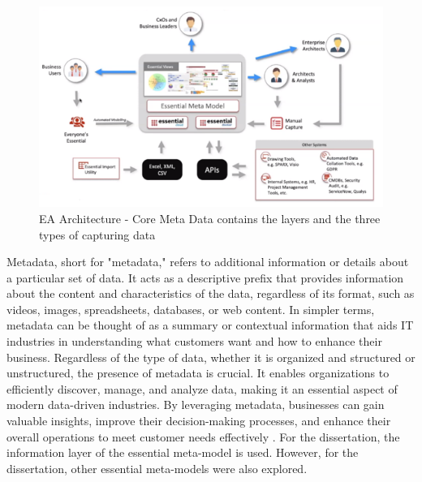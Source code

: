 \documentclass{article}
\begin{document}
\begin{figure}[ht!]
    \centering
    \includegraphics[scale=0.8]{ea-architecture}
    \caption{EA Architecture - 
Core Meta Data contains the layers and the three types of capturing data }
    \label{fig:ea-architecture}
\end{figure}

Metadata, short for "metadata," refers to additional information or details about a particular set of data. It acts as a descriptive prefix that provides information about the content and characteristics of the data, regardless of its format, such as videos, images, spreadsheets, databases, or web content. In simpler terms, metadata can be thought of as a summary or contextual information that aids IT industries in understanding what customers want and how to enhance their business. Regardless of the type of data, whether it is organized and structured or unstructured, the presence of metadata is crucial. It enables organizations to efficiently discover, manage, and analyze data, making it an essential aspect of modern data-driven industries. By leveraging metadata, businesses can gain valuable insights, improve their decision-making processes, and enhance their overall operations to meet customer needs effectively \parencite{marr2021}. For the dissertation, the information layer of the essential meta-model is used. However, for the dissertation, other essential meta-models were also explored.
\end{document}
